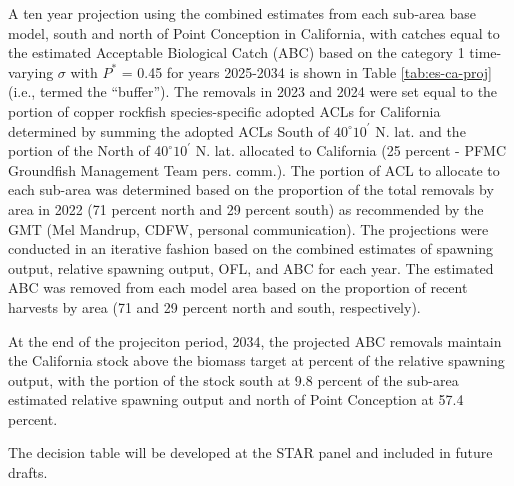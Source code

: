 \documentclass[11pt,
  english,
  letterpaper,
]{article}
\begin{document}
A ten year projection using the combined estimates from each sub-area base model, south and north of Point Conception in California, with catches equal to the estimated Acceptable Biological Catch (ABC) based on the category 1 time-varying \(\sigma\) with \(P^*\) = 0.45 for years 2025-2034 is shown in Table \ref{tab:es-ca-proj} (i.e., termed the ``buffer''). The removals in 2023 and 2024 were set equal to the portion of copper rockfish species-specific adopted ACLs for California determined by summing the adopted ACLs South of $40^\circ 10^\prime$ N. lat. and the portion of the North of $40^\circ 10^\prime$ N. lat. allocated to California (25 percent - PFMC Groundfish Management Team pers. comm.). The portion of ACL to allocate to each sub-area was determined based on the proportion of the total removals by area in 2022 (71 percent north and 29 percent south) as recommended by the GMT (Mel Mandrup, CDFW, personal communication). The projections were conducted in an iterative fashion based on the combined estimates of spawning output, relative spawning output, OFL, and ABC for each year. The estimated ABC was removed from each model area based on the proportion of recent harvests by area (71 and 29 percent north and south, respectively).

At the end of the projeciton period, 2034, the projected ABC removals maintain the California stock above the biomass target at percent of the relative spawning output, with the portion of the stock south at 9.8 percent of the sub-area estimated relative spawning output and north of Point Conception at 57.4 percent.

The decision table will be developed at the STAR panel and included in future drafts.

\begingroup\fontsize{10}{12}\selectfont
\end{document}
